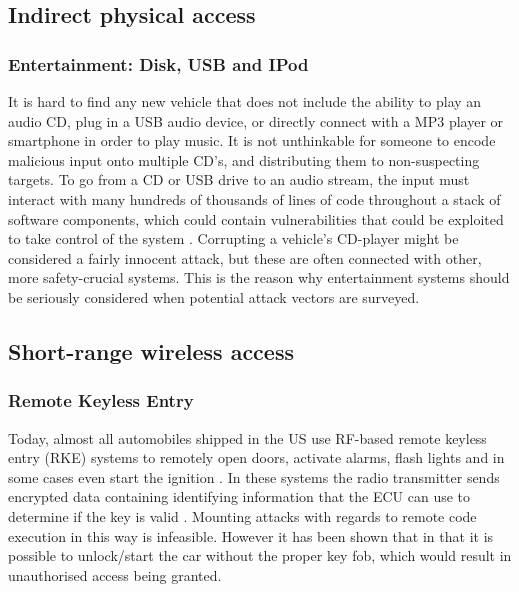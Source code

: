 \subsection{Indirect physical access}
\label{subsec:indirect_physical_access}

\subsubsection{Entertainment: Disk, USB and IPod} 
\label{subsubsec:entertainment}
It is hard to find any new vehicle that does not include the ability to play an audio CD, plug in a USB audio device, or directly connect with a MP3 player or smartphone in order to play music. It is not unthinkable for someone to encode malicious input onto multiple CD's, and distributing them to non-suspecting targets. To go from a CD or USB drive to an audio stream, the input must interact with many hundreds of thousands of lines of code throughout a stack of software components, which could contain vulnerabilities that could be exploited to take control of the system \cite{Pike15}. Corrupting a vehicle's CD-player might be considered a fairly innocent attack, but these are often connected with other, more safety-crucial systems. This is the reason why entertainment systems should be seriously considered when potential attack vectors are surveyed.

\subsection{Short-range wireless access}
\label{subsec:short-range_wireless_access}

\subsubsection{Remote Keyless Entry}
\label{subsubsec:rke}

Today, almost all automobiles shipped in the US use RF-based remote keyless entry (RKE) systems to remotely open doors, activate alarms, flash lights and in some cases even start the ignition \cite{Kosher}. In these systems the radio transmitter sends encrypted data containing identifying information that the ECU can use to determine if the key is valid \cite{MillerA}. Mounting attacks with regards to remote code execution in this way is infeasible. However it has been shown that in \cite{KeeLoq} that it is possible to unlock/start the car without the proper key fob, which would result in unauthorised access being granted.


